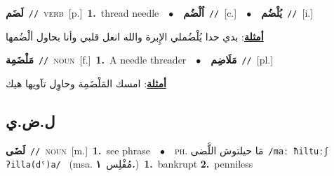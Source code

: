 \documentclass[10pt,a4paper,twoside]{article} %
\begin{document}
\begin{multicols}{2}
{\setlength\topsep{0pt}\textbf{\foreignlanguage{arabic}{لَضَم}}\ {\color{gray}\texttt{//}\color{black}}\ \textsc{verb}\ [p.]\ \textbf{1.}~thread needle\ \ $\bullet$\ \ \setlength\topsep{0pt}\textbf{\foreignlanguage{arabic}{اُلْضُم}}\ {\color{gray}\texttt{//}\color{black}}\ [c.]\ \ $\bullet$\ \ \setlength\topsep{0pt}\textbf{\foreignlanguage{arabic}{يُلْضُم}}\ {\color{gray}\texttt{//}\color{black}}\ [i.]\  \begin{flushright}\color{gray}\foreignlanguage{arabic}{\textbf{\underline{\foreignlanguage{arabic}{أمثلة}}}: بدي حدا يُلْضُملي الإِبرة والله انعل قلبي وأنا بحاول ألْضُمها}\end{flushright}\color{black}} \vspace{2mm}

{\setlength\topsep{0pt}\textbf{\foreignlanguage{arabic}{مَلْضَمِة}}\ {\color{gray}\texttt{//}\color{black}}\ \textsc{noun}\ [f.]\ \textbf{1.}~A needle threader\ \ $\bullet$\ \ \setlength\topsep{0pt}\textbf{\foreignlanguage{arabic}{مَلَاضِم}}\ {\color{gray}\texttt{//}\color{black}}\ [pl.]\  \begin{flushright}\color{gray}\foreignlanguage{arabic}{\textbf{\underline{\foreignlanguage{arabic}{أمثلة}}}: امسك المَلْضَمِة وحاوِل تآويها هيك}\end{flushright}\color{black}} \vspace{2mm}

\vspace{-3mm}
\subsection*{\color{blue}\foreignlanguage{arabic}{ل.ض.ي}\color{blue}{}} 

{\setlength\topsep{0pt}\textbf{\foreignlanguage{arabic}{لَضَى}}\ {\color{gray}\texttt{//}\color{black}}\ \textsc{noun}\ [m.]\ \textbf{1.}~see phrase\ \ $\bullet$\ \ \textsc{ph.} \color{gray} \foreignlanguage{arabic}{مَا حيلتوش اللَّضى}\color{black}\ {\color{gray}\texttt{/{\sffamily maː ħiltuːʃ ʔilla(dˤ)a}/}\color{black}}\ \color{gray} (msa. \foreignlanguage{arabic}{مُفْلِس}~\foreignlanguage{arabic}{\textbf{١.}})\color{black}\ \textbf{1.}~bankrupt  \textbf{2.}~penniless\ } \vspace{2mm}


\end{multicols}
\end{document}
